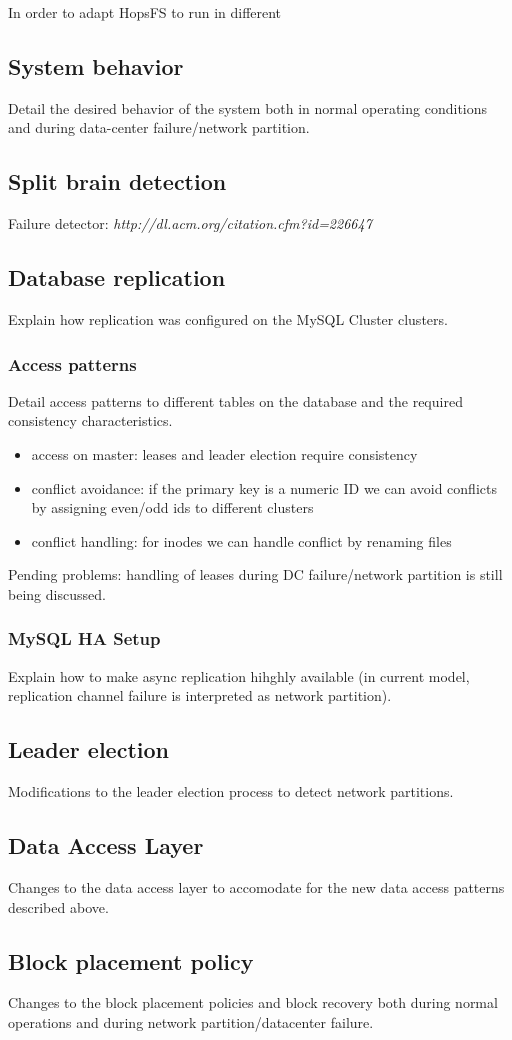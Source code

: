 In order to adapt HopsFS to run in different 

\subsection{System behavior}
Detail the desired behavior of the system both in normal operating conditions and during data-center failure/network partition.

\subsection{Split brain detection}
Failure detector: 
\textit{http://dl.acm.org/citation.cfm?id=226647}

\subsection{Database replication}
Explain how replication was configured on the MySQL Cluster clusters.
\subsubsection{Access patterns}
Detail access patterns to different tables on the database and the required consistency characteristics.
\begin{itemize}
    \item access on master: leases and leader election require consistency
    \item conflict avoidance: if the primary key is a numeric ID we can avoid conflicts by assigning even/odd ids to different clusters
    \item conflict handling: for inodes we can handle conflict by renaming files
\end{itemize}

Pending problems: handling of leases during DC failure/network partition is still being discussed.

\subsubsection{MySQL HA Setup}
Explain how to make async replication hihghly available (in current model, replication channel failure is interpreted as network partition).

\subsection{Leader election}
Modifications to the leader election process to detect network partitions.
\subsection{Data Access Layer}
Changes to the data access layer to accomodate for the new data access patterns described above.
\subsection{Block placement policy}
Changes to the block placement policies and block recovery both during normal operations and during network partition/datacenter failure.